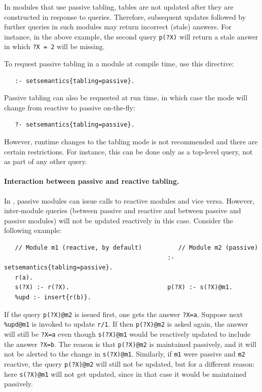 \documentclass[11pt]{article}
\newcommand{\ERGO}{\mbox{\smaller{\ensuremath{\cal{E}}\smaller{{\sc{RGO}}}}}\xspace}
\newcommand{\FLSYSTEM}{\ERGO}
\begin{document}
In \FLSYSTEM modules that use passive tabling, tables are not updated
after they are constructed in response to queries. Therefore, subsequent
updates followed by further queries in such modules may
return incorrect (stale) answers. For instance, in the above example,
the second query \texttt{p(?X)} will return a stale answer in which 
\texttt{?X = 2} will be missing.  

To request passive tabling in a module at compile time, use this directive:
\begin{verbatim}
   :- setsemantics{tabling=passive}.
\end{verbatim}
Passive tabling can also be requested at run time, in which case the mode
will change from reactive to passive on-the-fly:
\begin{verbatim}
   ?- setsemantics{tabling=passive}.
\end{verbatim}
However, runtime changes to the tabling mode is not recommended and there
are certain restrictions. For instance, this can be done only as a
top-level query, not as part of any other query.

\paragraph{Interaction between passive and reactive tabling.}
In \FLSYSTEM, passive modules can issue calls to reactive modules and vice
versa. However, inter-module queries (between passive and reactive
and between passive and passive modules)
will not be updated reactively in this case.
Consider the following example:
\begin{verbatim}
   // Module m1 (reactive, by default)          // Module m2 (passive)
                                             :- setsemantics{tabling=passive}.
   r(a).                                     
   s(?X) :- r(?X).                           p(?X) :- s(?X)@m1.
   %upd :- insert{r(b)}.
\end{verbatim}
If the query \texttt{p(?X)@m2} is issued first, one gets the answer \texttt{?X=a}.
Suppose next \texttt{\%upd@m1} is invoked to update \texttt{r/1}.
If then \texttt{p(?X)@m2} is asked again, the answer will still be
\texttt{?X=a} even though \texttt{s(?X)@m1} would be reactively updated to
include the answer \texttt{?X=b}. The reason is that \texttt{p(?X)@m2} is
maintained passively, and it will not be alerted to the change in
\texttt{s(?X)@m1}. Similarly, if \texttt{m1}  were
passive and \texttt{m2} reactive, the query \texttt{p(?X)@m2} will still not be
updated, but for a different reason: here \texttt{s(?X)@m1} will not get
updated, since in that case it would be maintained passively.
\end{document}

